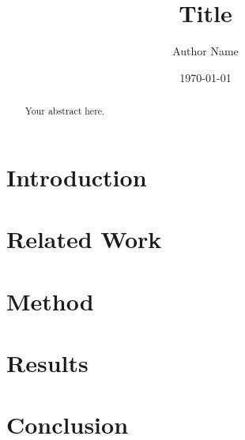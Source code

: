 \documentclass[12pt]{article}
\title{Title}
\author{Author Name}
\date{\today}
\begin{document}
\maketitle

\begin{abstract}
Your abstract here.
\end{abstract}

\section{Introduction}

\section{Related Work}

\section{Method}

\section{Results}

\section{Conclusion}



\end{document}
